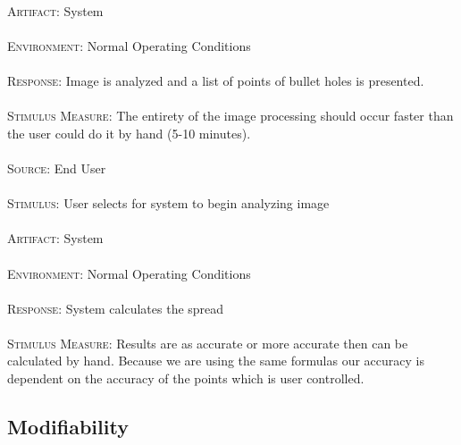 \paragraph{}\textsc{Artifact:} System
\paragraph{}\textsc{Environment:} Normal Operating Conditions
\paragraph{}\textsc{Response:} Image is analyzed and a list of points of bullet holes is presented.
\paragraph{}\textsc{Stimulus Measure:} The entirety of the image processing should occur faster than the user could do it by hand (5-10 minutes).

\paragraph{}\textsc{Source:} End User
\paragraph{}\textsc{Stimulus:} User selects for system to begin analyzing image
\paragraph{}\textsc{Artifact:} System
\paragraph{}\textsc{Environment:} Normal Operating Conditions
\paragraph{}\textsc{Response:} System calculates the spread
\paragraph{}\textsc{Stimulus Measure:} Results are as accurate or more accurate then can be calculated by hand. Because we are using the same formulas our accuracy is dependent on the accuracy of the points which is user controlled.

\subsection{Modifiability}
